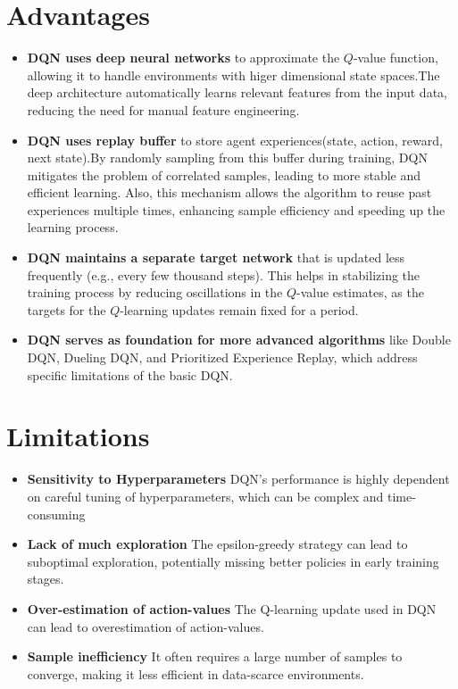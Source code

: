 \documentclass{report}
\begin{document}
\section*{Advantages}
\begin{itemize}
    \item \textbf{DQN uses deep neural networks} to approximate the $Q$-value function, allowing it to handle environments with higer dimensional state spaces.The deep architecture automatically learns relevant features from the input data, reducing the need for manual feature engineering.
    \item \textbf{DQN uses replay buffer} to store agent experiences(state, action, reward, next state).By randomly sampling from this buffer during training, DQN mitigates the problem of correlated samples, leading to more stable and efficient learning. Also, this mechanism allows the algorithm to reuse past experiences multiple times, enhancing sample efficiency and speeding up the learning process.
    \item \textbf{DQN maintains a separate target network} that is updated less frequently (e.g., every few thousand steps). This helps in stabilizing the training process by reducing oscillations in the $Q$-value estimates, as the targets for the $Q$-learning updates remain fixed for a period.
    \item \textbf{DQN serves as foundation for more advanced algorithms} like  Double DQN, Dueling DQN, and Prioritized Experience Replay, which address specific limitations of the basic DQN.
\end{itemize}
\section*{Limitations}
\begin{itemize}
    \item \textbf{Sensitivity to Hyperparameters}  DQN's performance is highly dependent on careful tuning of hyperparameters, which can be complex and time-consuming
    \item \textbf{Lack of much exploration} The epsilon-greedy strategy can lead to suboptimal exploration, potentially missing better policies in early training stages.
    \item \textbf{Over-estimation of action-values} The Q-learning update used in DQN can lead to overestimation of action-values.
    \item \textbf{Sample inefficiency} It often requires a large number of samples to converge, making it less efficient in data-scarce environments.
\end{itemize}
\end{document}
